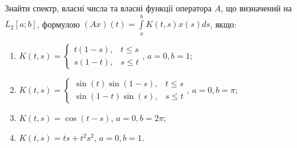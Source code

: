 \begin{exercise}
    Знайти спектр, власні числа та власні функції оператора $A$,
    що визначений на $L_2[a;b]$, формулою $(Ax)(t) = \int\limits_a^b K(t,s) x(s)ds$, якщо:
    \begin{enumerate}
        \item $K(t,s) = \begin{cases}
            t(1-s), & t \leq s \\
            s(1-t), & s \leq t
        \end{cases}$, $a = 0, b = 1$;
        \item $K(t,s) = \begin{cases}
            \sin(t)\sin(1-s), & t \leq s \\
            \sin(1-t)\sin(s), & s \leq t
        \end{cases}$, $a = 0, b = \pi$;
        \item $K(t,s) = \cos(t-s)$, $a = 0, b = 2\pi$;
        \item $K(t,s) = ts + t^2 s^2$, $a = 0, b = 1$.
    \end{enumerate}
\end{exercise}